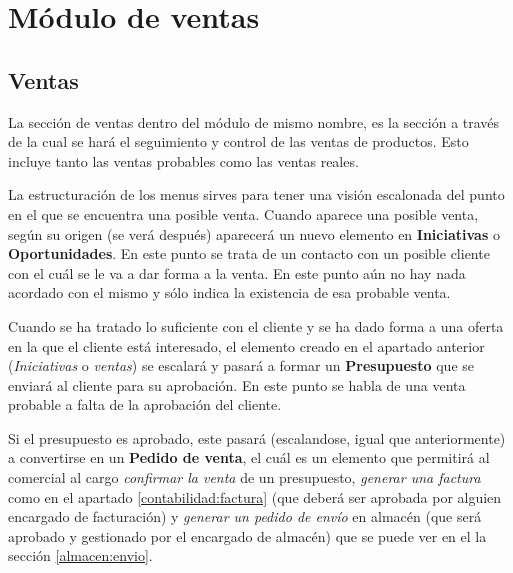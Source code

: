 %
%
%
%

\chapter{Módulo de ventas}



\section{Ventas}

La sección de ventas dentro del módulo de mismo nombre, es la sección a través de la 
cual se hará el seguimiento y control de las ventas de productos. Esto incluye tanto
las ventas probables como las ventas reales.

La estructuración de los menus sirves para tener una visión escalonada del punto en el que
se encuentra una posible venta. Cuando aparece una posible venta, según su origen (se verá
después) aparecerá un nuevo elemento en \textbf{Iniciativas} o \textbf{Oportunidades}. En
este punto se trata de un contacto con un posible cliente con el cuál se le va a dar forma a
la venta. En este punto aún no hay nada acordado con el mismo y sólo indica la existencia
de esa probable venta.

Cuando se ha tratado lo suficiente con el cliente y se ha dado forma a una oferta en la que el
cliente está interesado, el elemento creado en el apartado anterior (\emph{Iniciativas} o
\emph{ventas}) se escalará y pasará a formar un \textbf{Presupuesto} que se enviará al cliente
para su aprobación. En este punto se habla de una venta probable a falta de la aprobación del
cliente.

Si el presupuesto es aprobado, este pasará (escalandose, igual que anteriormente) a convertirse
en un \textbf{Pedido de venta}, el cuál es un elemento que permitirá al comercial al cargo
\emph{confirmar la venta} de un presupuesto, \emph{generar una factura} como en el apartado
\ref{contabilidad:factura} (que deberá ser aprobada por alguien
encargado de facturación) y \emph{generar un pedido de envío} en almacén (que será aprobado y
 gestionado por el encargado de almacén) que se puede ver en el la sección \ref{almacen:envio}.


